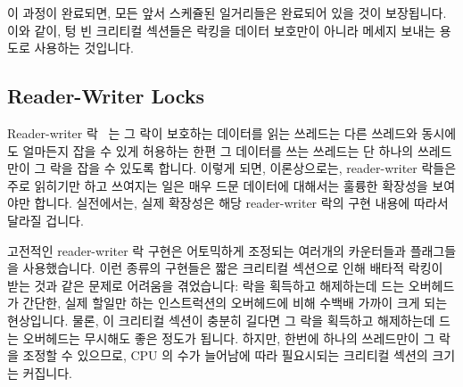 {	이 과정이 완료되면, 모든 앞서 스케쥴된 일거리들은 완료되어 있을 것이
	보장됩니다.
	이와 같이, 텅 빈 크리티컬 섹션들은 락킹을 데이터 보호만이 아니라 메세지
	보내는 용도로 사용하는 것입니다.

} \QuickQuizEnd

\subsection{Reader-Writer Locks}
\label{sec:locking:Reader-Writer Locks}

Reader-writer 락~\cite{Courtois71} 는 그 락이 보호하는 데이터를 읽는 쓰레드는
다른 쓰레드와 동시에도 얼마든지 잡을 수 있게 허용하는 한편 그 데이터를 쓰는
쓰레드는 단 하나의 쓰레드만이 그 락을 잡을 수 있도록 합니다.
이렇게 되면, 이론상으로는, reader-writer 락들은 주로 읽히기만 하고 쓰여지는
일은 매우 드문 데이터에 대해서는 훌륭한 확장성을 보여야만 합니다.
실전에서는, 실제 확장성은 해당 reader-writer 락의 구현 내용에 따라서 달라질
겁니다.

고전적인 reader-writer 락 구현은 어토믹하게 조정되는 여러개의 카운터들과
플래그들을 사용했습니다.
이런 종류의 구현들은 짧은 크리티컬 섹션으로 인해 배타적 락킹이 받는 것과 같은
문제로 어려움을 겪었습니다: 락을 획득하고 해제하는데 드는 오버헤드가 간단한,
실제 할일만 하는 인스트럭션의 오버헤드에 비해 수백배 가까이 크게 되는
현상입니다.
물론, 이 크리티컬 섹션이 충분히 길다면 그 락을 획득하고 해제하는데 드는
오버헤드는 무시해도 좋은 정도가 됩니다.
하지만, 한번에 하나의 쓰레드만이 그 락을 조정할 수 있으므로, CPU 의 수가
늘어남에 따라 필요시되는 크리티컬 섹션의 크기는 커집니다.

